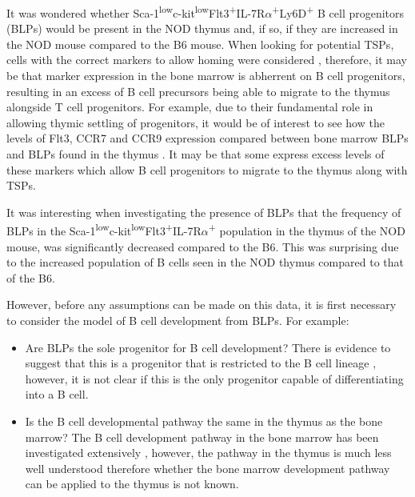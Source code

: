 It was wondered whether Sca-1\textsuperscript{low}c-kit\textsuperscript{low}Flt3\textsuperscript{+}IL-7R$\alpha$\textsuperscript{+}Ly6D\textsuperscript{+} B cell progenitors (BLPs) would be present in the NOD thymus and, if so, if they are increased in the NOD mouse compared to the B6 mouse.
When looking for potential TSPs, cells with the correct markers to allow homing were considered \citep{Zlotoff2011}, therefore, it may be that marker expression in the bone marrow is abherrent on B cell progenitors, resulting in an excess of B cell precursors being able to migrate to the thymus alongside T cell progenitors.
For example, due to their fundamental role in allowing thymic settling of progenitors, it would be of interest to see how the levels of Flt3, CCR7 and CCR9 expression compared between bone marrow BLPs and BLPs found in the thymus \citep{Zlotoff2011, Zlotoff2010}.
It may be that some express excess levels of these markers which allow B cell progenitors to migrate to the thymus along with TSPs.

It was interesting when investigating the presence of BLPs that the frequency of BLPs in the Sca-1\textsuperscript{low}c-kit\textsuperscript{low}Flt3\textsuperscript{+}IL-7R$\alpha$\textsuperscript{+} population in the thymus of the NOD mouse, was significantly decreased compared to the B6.
This was surprising due to the increased population of B cells seen in the NOD thymus compared to that of the B6.

However, before any assumptions can be made on this data, it is first necessary to consider the model of B cell development from BLPs.
For example:
\begin{itemize}
\item Are BLPs the sole progenitor for B cell development? There is evidence to suggest that this is a progenitor that is restricted to the B cell lineage \citep{Inlay2009}, however, it is not clear if this is the only progenitor capable of differentiating into a B cell.
\item Is the B cell developmental pathway the same in the thymus as the bone marrow? The B cell development pathway in the bone marrow has been investigated extensively \citep{Welinder2011}, however, the pathway in the thymus is much less well understood therefore whether the bone marrow development pathway can be applied to the thymus is not known. 
\end{itemize}

